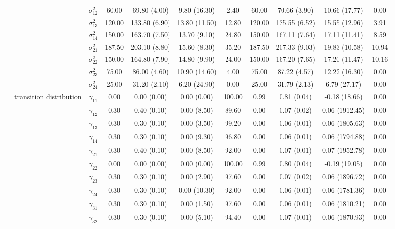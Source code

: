 \begin{table}[h]
{\begin{tabular}{ccccccccccc}
 &  & $\sigma^2_{12}$ & 60.00 & 69.80 (4.00) & 9.80 (16.30) & 2.40 & 60.00 & 70.66 (3.90) & 10.66 (17.77) & 0.00 \\
 &  & $\sigma^2_{13}$ & 120.00 & 133.80 (6.90) & 13.80 (11.50) & 12.80 & 120.00 & 135.55 (6.52) & 15.55 (12.96) & 3.91 \\
 &  & $\sigma^2_{14}$ & 150.00 & 163.70 (7.50) & 13.70 (9.10) & 24.80 & 150.00 & 167.11 (7.64) & 17.11 (11.41) & 8.59 \\
 &  & $\sigma^2_{21}$ & 187.50 & 203.10 (8.80) & 15.60 (8.30) & 35.20 & 187.50 & 207.33 (9.03) & 19.83 (10.58) & 10.94 \\
 &  & $\sigma^2_{22}$ & 150.00 & 164.80 (7.90) & 14.80 (9.90) & 24.00 & 150.00 & 167.20 (7.65) & 17.20 (11.47) & 10.16 \\
 &  & $\sigma^2_{23}$ & 75.00 & 86.00 (4.60) & 10.90 (14.60) & 4.00 & 75.00 & 87.22 (4.57) & 12.22 (16.30) & 0.00 \\
 &  & $\sigma^2_{24}$ & 25.00 & 31.20 (2.10) & 6.20 (24.90) & 0.00 & 25.00 & 31.79 (2.13) & 6.79 (27.17) & 0.00 \\
 & transition distribution & $\gamma_{11}$ & 0.00 & 0.00 (0.00) & 0.00 (0.00) & 100.00 & 0.99 & 0.81 (0.04) & -0.18 (18.66) & 0.00 \\
 & \multirow{15}{*}{} & $\gamma_{12}$ & 0.30 & 0.40 (0.10) & 0.00 (8.50) & 89.60 & 0.00 & 0.07 (0.02) & 0.06 (1912.45) & 0.00 \\
 &  & $\gamma_{13}$ & 0.30 & 0.30 (0.10) & 0.00 (3.50) & 99.20 & 0.00 & 0.06 (0.01) & 0.06 (1805.63) & 0.00 \\
 &  & $\gamma_{14}$ & 0.30 & 0.30 (0.10) & 0.00 (9.30) & 96.80 & 0.00 & 0.06 (0.01) & 0.06 (1794.88) & 0.00 \\
 &  & $\gamma_{21}$ & 0.30 & 0.40 (0.10) & 0.00 (8.50) & 92.00 & 0.00 & 0.07 (0.01) & 0.07 (1952.78) & 0.00 \\
 &  & $\gamma_{22}$ & 0.00 & 0.00 (0.00) & 0.00 (0.00) & 100.00 & 0.99 & 0.80 (0.04) & -0.19 (19.05) & 0.00 \\
 &  & $\gamma_{23}$ & 0.30 & 0.30 (0.10) & 0.00 (2.90) & 97.60 & 0.00 & 0.07 (0.02) & 0.06 (1896.72) & 0.00 \\
 &  & $\gamma_{24}$ & 0.30 & 0.30 (0.10) & 0.00 (10.30) & 92.00 & 0.00 & 0.06 (0.01) & 0.06 (1781.36) & 0.00 \\
 &  & $\gamma_{31}$ & 0.30 & 0.30 (0.10) & 0.00 (1.50) & 97.60 & 0.00 & 0.06 (0.01) & 0.06 (1810.21) & 0.00 \\
 &  & $\gamma_{32}$ & 0.30 & 0.30 (0.10) & 0.00 (5.10) & 94.40 & 0.00 & 0.07 (0.01) & 0.06 (1870.93) & 0.00 \\

\end{tabular}}
\end{table}
